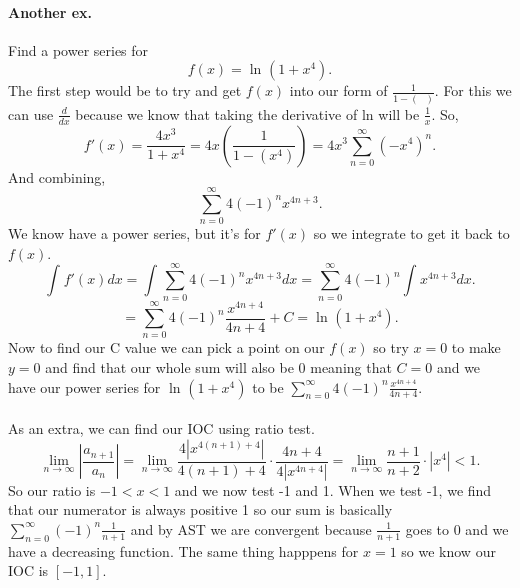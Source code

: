 \paragraph{Another ex.}
Find a power series for 
\[
f\left( x \right) = \ln^{  } \left( 1+x^{ 4 } \right) 
.\] 
The first step would be to try and get $ f\left( x \right)  $ into our form of $ \frac{ 1 }{ 1- \left( \text{  } \right)  }  $.  For this we can use $ \frac{ d }{ dx }  $ because we know that taking the derivative of ln will be $ \frac{ 1 }{ x }  $. So,
\[
f'\left( x \right) = \frac{ 4x^3 }{ 1+x^{ 4 } } = 4x\left( \frac{ 1 }{ 1-\left( x^{ 4 } \right)  }  \right) = 4x^3\sum_{ n=0 } ^{ \infty } \left( -x^{ 4 } \right) ^{ n }
.\] 
And combining,
\[
\sum_{ n=0 } ^{ \infty } 4\left( -1 \right) ^{ n }x^{ 4n+3 }
.\] 
We know have a power series, but it's for $ f'\left( x \right)  $ so we integrate to get it back to $ f\left( x \right)  $. 
\[
\int_{  }^{  } f'\left( x \right) dx = \int_{  }^{  } \sum_{ n=0 } ^{ \infty } 4\left( -1 \right) ^{ n }x^{ 4n+3 }dx= \sum_{ n=0 } ^{ \infty } 4\left( -1 \right) ^{ n }\int_{  }^{  } x^{ 4n+3 }dx
.\] 
\[
=\sum_{ n=0 } ^{ \infty } 4\left( -1 \right) ^{ n }\frac{ x^{ 4n+4 } }{ 4n+4 }+C= \ln^{  } \left( 1+x^{ 4 } \right) 
.\] 
Now to find our C value we can pick a point on our $ f\left( x \right)  $ so try $ x=0 $ to make $ y=0 $ and find that our whole sum will also be 0 meaning that $ C=0 $ and we have our power series for $ \ln^{  } \left( 1+x^{ 4 } \right)  $ to be $ \sum_{ n=0 } ^{ \infty } 4\left( -1 \right) ^{ n } \frac{ x^{ 4n+4 } }{ 4n+4 } $. \\ \\
As an extra, we can find our IOC using ratio test.
\[
\lim_{ n \to \infty} \left| \frac{ a_{ n+1 } }{ a_n } \right| = \lim_{ n \to \infty} \frac{ 4 \left|  x^{ 4\left( n+1 \right) +4 } \right|}{ 4\left( n+1 \right) +4 }\cdot \frac{ 4n+4 }{ 4 \left| x^{ 4n+4 } \right| } = \lim_{ n \to \infty} \frac{ n+1 }{ n+2 }\cdot \left| x^{ 4 } \right|<1
.\] 
So our ratio is $ -1<x<1 $ and we now test -1 and 1. When we test -1, we find that our numerator is always positive 1 so our sum is basically $ \sum_{ n=0 } ^{ \infty } \left( -1 \right) ^{ n }\frac{ 1 }{ n+1 }  $ and by AST we are convergent because $ \frac{ 1 }{ n+1 }  $ goes to 0 and we have a decreasing function. The same thing happpens for $ x=1 $ so we know our IOC is $ \left[ -1,1 \right]  $. 
